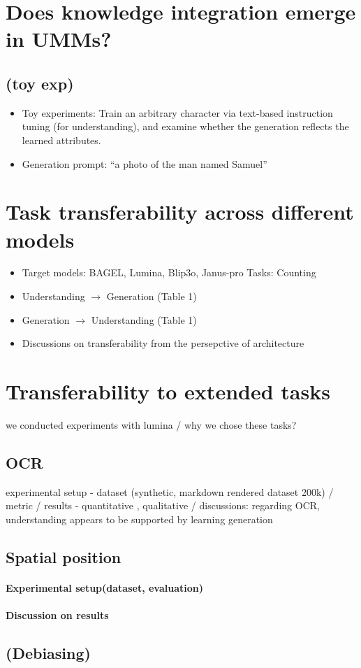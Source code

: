 \section{Does knowledge integration emerge in UMMs?}
\subsection{(toy exp)}

\begin{itemize}
    \item Toy experiments: Train an arbitrary character via text-based instruction tuning (for understanding), and examine whether the generation reflects the learned attributes.
    \item Generation prompt: ``a photo of the man named Samuel''
\end{itemize}


\section{Task transferability across different models}


\begin{itemize}
    \item Target models: BAGEL, Lumina, Blip3o, Janus-pro Tasks: Counting
    \item Understanding $\rightarrow$ Generation (Table 1)
    \item Generation $\rightarrow$ Understanding (Table 1) 
    \item Discussions on transferability from the persepctive of architecture
\end{itemize}

\section{Transferability to extended tasks}
we conducted experiments with lumina / why we chose these tasks? 
\subsection{OCR}

experimental setup - dataset (synthetic, markdown rendered dataset 200k) / metric / results - quantitative , qualitative / discussions: regarding OCR, understanding appears to be supported by learning generation
\subsection{Spatial position}
\paragraph{Experimental setup(dataset, evaluation)}
\paragraph{Discussion on results}
\subsection{(Debiasing)}


